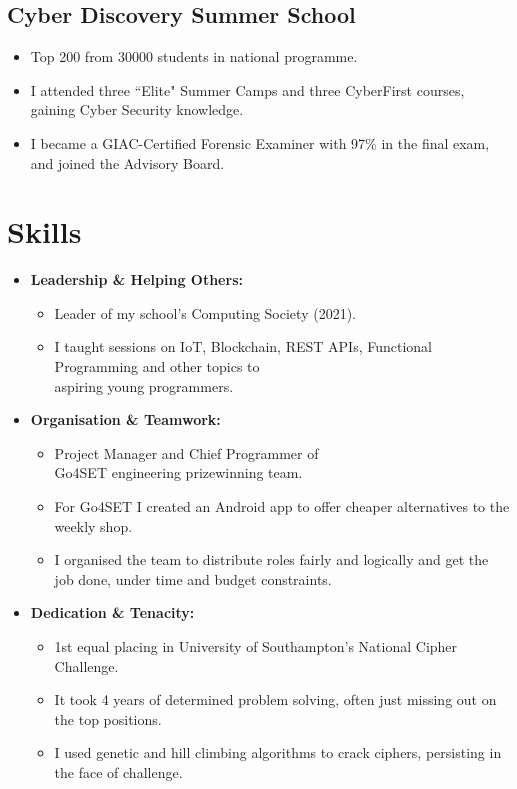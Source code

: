 \documentclass{Resume}
\begin{document}
		\subsection{Cyber Discovery Summer School}
				\begin{itemize}
				    \item Top 200 from 30000 students in national programme.
				    \item I attended three ``Elite" Summer Camps and three CyberFirst courses, gaining Cyber Security knowledge.
				    \item I became a GIAC-Certified Forensic Examiner with 97\% in the final exam, and joined the Advisory Board.
				\end{itemize}


	\section{Skills}
			\begin{itemize}
				\item \textbf{Leadership \& Helping Others:} 
				    \begin{itemize}
				        \item Leader of my school's Computing Society (2021).
				        \item I taught sessions on IoT, Blockchain, REST APIs, Functional Programming and other topics to \\ aspiring young programmers.
				    \end{itemize} 
				\item \textbf{Organisation \& Teamwork:} 
				    \begin{itemize}
				        \item Project Manager and Chief Programmer of \\ Go4SET engineering prizewinning team.
				        \item For Go4SET I created an Android app to offer cheaper alternatives to the weekly shop.
				        \item I organised the team to distribute roles fairly and logically and get the job done, under time and budget constraints.
				    \end{itemize}
				\item \textbf{Dedication \& Tenacity:}
				    \begin{itemize}
				        \item 1st equal placing in University of Southampton's National Cipher Challenge.
				        \item It took 4 years of determined problem solving, often just missing out on the top positions.
				        \item I used genetic and hill climbing algorithms to crack ciphers, persisting in the face of challenge.
				    \end{itemize}
			\end{itemize}		
\end{document}
